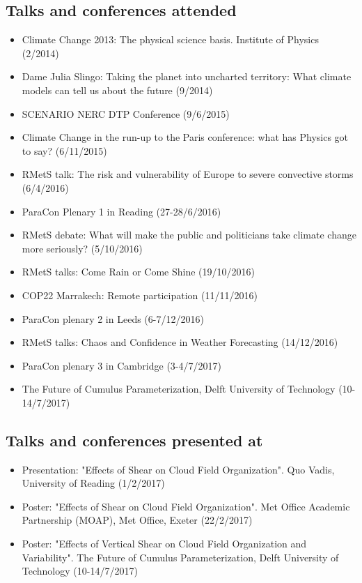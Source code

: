 \documentclass[11pt,a4paper]{article}
\begin{document}
\subsection*{Talks and conferences attended}

\begin{itemize}
  \item Climate Change 2013: The physical science basis. Institute of Physics (2/2014)
  \item Dame Julia Slingo: Taking the planet into uncharted territory: What climate models can tell us about the future (9/2014)
  \item SCENARIO NERC DTP Conference (9/6/2015)
  \item Climate Change in the run-up to the Paris conference: what has Physics got to say? (6/11/2015)
  \item RMetS talk: The risk and vulnerability of Europe to severe convective storms (6/4/2016)
  \item ParaCon Plenary 1 in Reading (27-28/6/2016)
  \item RMetS debate: What will make the public and politicians take climate change more seriously? (5/10/2016)
  \item RMetS talks: Come Rain or Come Shine (19/10/2016)
  \item COP22 Marrakech: Remote participation (11/11/2016)
  \item ParaCon plenary 2 in Leeds (6-7/12/2016)
  \item RMetS talks: Chaos and Confidence in Weather Forecasting (14/12/2016)
  \item ParaCon plenary 3 in Cambridge (3-4/7/2017)
  \item The Future of Cumulus Parameterization, Delft University of Technology (10-14/7/2017)
\end{itemize}

\subsection*{Talks and conferences presented at}

\begin{itemize}
  \item Presentation: "Effects of Shear on Cloud Field Organization". Quo Vadis, University of Reading (1/2/2017)
  \item Poster: "Effects of Shear on Cloud Field Organization". Met Office Academic Partnership (MOAP), Met Office, Exeter (22/2/2017)
  \item Poster: "Effects of Vertical Shear on Cloud Field Organization and Variability". The Future of Cumulus Parameterization, Delft University of Technology (10-14/7/2017)
\end{itemize}
\end{document}
